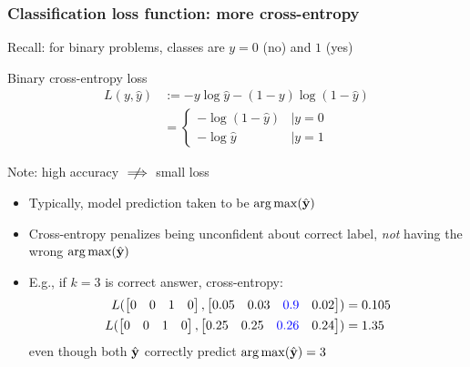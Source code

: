 \begin{frame}
    \frametitle{Classification loss function: more cross-entropy}
    Recall: for binary problems, classes are $y = 0$ (no) and $1$ (yes)

    \begin{block}{Binary cross-entropy loss}
        \vspace{-1em}
        \begin{align*}
            L(y, \hat{y}) &:= -y \log \hat{y} - (1 - y) \log(1 - \hat{y}) \\
            &= \begin{cases}
                -\log(1 - \hat{y}) &\mid y = 0 \\
                -\log \hat{y} &\mid y = 1
            \end{cases}
        \end{align*}
    \end{block}
    \pause

    Note: high accuracy $\centernot\implies$ small loss
    \begin{itemize}
        \item Typically, model prediction taken to be $\operatorname*{arg\,max}(\hat{\mathbf{y}})$
        \item Cross-entropy penalizes being unconfident about correct label, \emph{not} having the wrong $\operatorname*{arg\,max}(\hat{\mathbf{y}})$
        \pause
        \item E.g., if $k = 3$ is correct answer, cross-entropy:
        \begin{align*}
            L(
                \begin{bmatrix} 0 & 0 & 1 & 0 \end{bmatrix},
                \begin{bmatrix}
                    0.05 & 0.03 & \textcolor{blue}{0.9} & 0.02
                \end{bmatrix}
            ) &= 0.105 \\
            L(
                \begin{bmatrix} 0 & 0 & 1 & 0 \end{bmatrix},
                \begin{bmatrix}
                    0.25 & 0.25 & \textcolor{blue}{0.26} & 0.24
                \end{bmatrix}
            ) &= 1.35
        \end{align*}
        even though both $\hat{\mathbf{y}}$ correctly predict $\operatorname*{arg\,max}(\hat{\mathbf{y}}) = 3$
    \end{itemize}
\end{frame}

